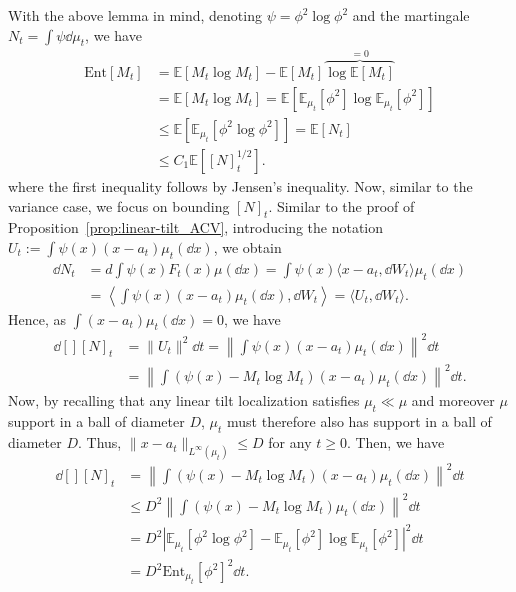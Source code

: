 With the above lemma in mind, denoting \(\psi = \phi^2 \log \phi^2\) and the martingale \(N_t = \int \psi \dd \mu_t\),
we have 
\begin{equation}\label{eq:entropy_bound}
  \begin{split}
    \text{Ent}[M_t] & = \mathbb{E}[M_t\log M_t] - \mathbb{E}[M_t]\overbrace{\log\mathbb{E}[M_t]}^{= 0}\\ 
      & = \mathbb{E}[M_t\log M_t] = \mathbb{E}[\mathbb{E}_{\mu_t}[\phi^2] \log\mathbb{E}_{\mu_t}[\phi^2]]\\
      & \le \mathbb{E}[\mathbb{E}_{\mu_t}[\phi^2 \log \phi^2]] = \mathbb{E}[N_t]\\ 
      & \le C_1 \mathbb{E}\left[[N]_t^{1 / 2}\right].
  \end{split}
\end{equation}
where the first inequality follows by Jensen's inequality. Now, similar to the variance case, we focus on 
bounding \([N]_t\). Similar to the proof of Proposition~\ref{prop:linear-tilt_ACV}, introducing the notation  
\(U_t := \int \psi(x)(x - a_t)\mu_t(\dd x)\), we obtain
\begin{align*}
  \dd N_t & = d \int \psi(x) F_t(x) \mu(\dd x) = \int \psi(x) \langle x - a_t, \dd W_t \rangle \mu_t(\dd x)\\
  & = \left\langle \int \psi(x)(x - a_t)\mu_t(\dd x), \dd W_t\right\rangle = \langle U_t, \dd W_t\rangle.
\end{align*}
Hence, as \(\int (x - a_t) \mu_t(\dd x) = 0\), we have
\begin{align*}
  \dd[] [N]_t & = \|U_t\|^2 \dd t = \left\|\int \psi(x)(x - a_t)\mu_t(\dd x)\right\|^2 \dd t\\
  & = \left\|\int (\psi(x) - M_t \log M_t)(x - a_t)\mu_t(\dd x)\right\|^2 \dd t.
\end{align*}
Now, by recalling that any linear tilt localization satisfies \(\mu_t \ll \mu\) and moreover 
\(\mu\) support in a ball of diameter \(D\), \(\mu_t\) must therefore also has support in a ball of diameter \(D\). 
Thus, \(\|x - a_t\|_{L^\infty(\mu_t)} \le D\) for any \(t \ge 0\). Then, we have  
\begin{align*}
  \dd[] [N]_t & = \left\|\int (\psi(x) - M_t \log M_t)(x - a_t)\mu_t(\dd x)\right\|^2 \dd t\\
  & \le D^2 \left\|\int (\psi(x) - M_t \log M_t)\mu_t(\dd x)\right\|^2 \dd t\\
  & = D^2 \left|\mathbb{E}_{\mu_t}[\phi^2 \log \phi^2] - \mathbb{E}_{\mu_t}[\phi^2] \log\mathbb{E}_{\mu_t}[\phi^2]\right|^2 \dd t\\
  & = D^2 \text{Ent}_{\mu_t}[\phi^2]^2 \dd t.
\end{align*}
